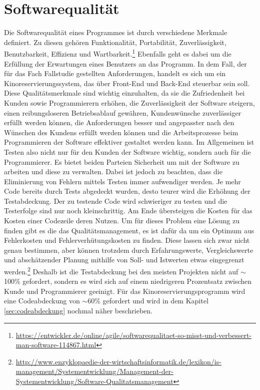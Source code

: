 \section{Softwarequalität}
\authorsection{\authorEJ}

Die Softwarequalität eines Programmes ist durch verschiedene Merkmale definiert. Zu diesen gehören Funktionalität, Portabilität, Zuverlässigkeit, Benutzbarkeit, Effizienz und Wartbarkeit.\footnote{\url{https://entwickler.de/online/agile/softwarequalitaet-so-misst-und-verbessert-man-software-114867.html}}
Ebenfalls geht es dabei um die Erfüllung der Erwartungen eines Benutzers an das Programm. In dem Fall, der für das Fach Fallstudie gestellten Anforderungen, handelt es sich um ein Kinoreservierungssystem, das über Front-End und Back-End steuerbar sein soll.
Diese Qualitätsmerkmale sind wichtig einzuhalten, da sie die Zufriedenheit bei Kunden sowie Programmierern erhöhen, die Zuverlässigkeit der Software steigern, einen reibungsloseren Betriebsablauf gewähren, Kundenwünsche zuverlässiger erfüllt werden können, die Anforderungen besser und angepasster nach den Wünschen des Kundens erfüllt werden können und die Arbeitsprozesse beim Programmieren der Software effektiver gestaltet werden kann.
Im Allgemeinen ist Testen also nicht nur für den Kunden der Software wichtig, sondern auch für die Programmierer. 
Es bietet beiden Parteien Sicherheit um mit der Software zu arbeiten und diese zu verwalten. 
Dabei ist jedoch zu beachten, dass die Eliminierung von Fehlern mittels Testen immer aufwendiger werden.
Je mehr Code bereits durch Tests abgedeckt wurden, desto teurer wird die Erhöhung der Testabdeckung. Der zu testende Code wird schwieriger zu testen und die Testerfolge sind nur noch kleinschrittig. Am Ende übersteigen die Kosten für das Kosten einer Codezeile deren Nutzen. Um für dieses Problem eine Lösung zu finden gibt es die das Qualitätsmanagement, es ist dafür da um ein Optimum aus Fehlerkosten und Fehlerverhütungskosten zu finden. Diese lassen sich zwar nicht genau bestimmen, aber können trotzdem durch Erfahrungswerte, Vergleichswerte und abschätzender Planung mithilfe von Soll- und Istwerten etwas eingegrenzt werden.\footnote{\url{http://www.enzyklopaedie-der-wirtschaftsinformatik.de/lexikon/is-management/Systementwicklung/Management-der-Systementwicklung/Software-Qualitatsmanagement}} Deshalb ist die Testabdeckung bei den meisten Projekten nicht auf $\sim$100\% gefordert, sondern es wird sich auf einem niedrigeren Prozentsatz zwischen Kunde und Programmierer geeinigt. Für das Kinoreservierungsprogramm wird eine Codeabdeckung von $\sim$60\% gefordert und wird in dem Kapitel \vref{sec:codeabdeckung} nochmal näher beschrieben.
